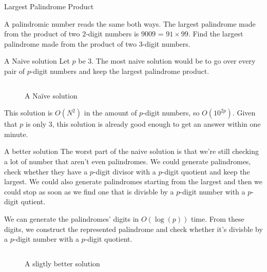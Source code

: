 \documentclass[main.tex]{subfiles}
\begin{document}
\begin{prob}{4}{Largest Palindrome Product}
  \begin{problem}
    A palindromic number reads the same both ways.
    The largest palindrome made from the product of two $2$-digit numbers is $9009$ = $91 \times 99$.
    Find the largest palindrome made from the product of two $3$-digit numbers.
  \end{problem}
  \begin{solutions}
    \begin{solution}{A Naive solution}
      Let $p$ be $3$.
      The most naive solution would be to go over every pair of $p$-digit numbers and keep the largest palindrome product.
      \begin{figure}[H]
        \inputminted[firstline=16, lastline=26]{c++}{\sol{004}{c++}/naive.cc}
        \caption{A Naïve solution}
      \end{figure}
      This solution is $O(N^2)$ in the amount of $p$-digit numbers, so $O(10^{2p})$.
      Given that $p$ is only $3$, this solution is already good enough to get an answer within one minute.
    \end{solution}


    \begin{solution}{A better solution}
      The worst part of the naive solution is that we're still checking a lot of number that aren't even palindromes.
      We could generate palindromes, check whether they have a $p$-digit divisor with a $p$-digit quotient and keep the largest.
      We could also generate palindromes starting from the largest and then we could stop as soon as we find one that is divisble by a $p$-digit number with a $p$-digit qutient.

      We can generate the palindromes' digits in $O(\log(p))$ time.
      From these digits, we construct the represented palindrome and check whether it's divisble by a $p$-digit number with a $p$-digit quotient.

      \begin{figure}[H]
        \inputminted[firstline=17, lastline=44]{c}{\sol{004}{c}/solution.c}
        \caption{A sligtly better solution}
      \end{figure}

    \end{solution}
  \end{solutions}
\end{prob}
\end{document}
